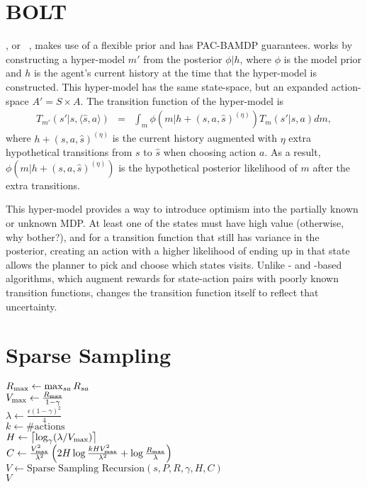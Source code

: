 \section{BOLT}

, or ~\cite{araya2012near}, makes use of a flexible prior and has PAC-BAMDP guarantees.  works by constructing a hyper-model $m'$ from the posterior $\phi|h$, where $\phi$ is the model prior and $h$ is the agent's current history at the time that the hyper-model is constructed. This hyper-model has the same state-space, but an expanded action-space $A' = S \times A$. The transition function of the hyper-model is
\begin{eqnarray}
T_{m'}(s'|s, \langle \hat s, a \rangle) &=& \int_m \phi(m|h+(s,a,\hat s)^{(\eta)})T_m(s'|s,a) d m,
\end{eqnarray}
where $h+(s,a,\hat s)^{(\eta)}$ is the current history augmented with $\eta$ extra hypothetical transitions from $s$ to $\hat s$ when choosing action $a$. As a result, $\phi(m|h+(s,a,\hat s)^{(\eta)})$ is the hypothetical posterior likelihood of $m$ after the extra transitions.

This hyper-model provides a way to introduce optimism into the partially known or unknown MDP. At least one of the states must have high value (otherwise, why bother?), and for a transition function that still has variance in the posterior, creating an action with a higher likelihood of ending up in that state allows the planner to pick and choose which states visits. Unlike - and -based algorithms, which augment rewards for state-action pairs with poorly known transition functions,  changes the transition function itself to reflect that uncertainty.



\section{Sparse Sampling}

\label{sec:rel:ss}

\begin{algorithm}[tb]
	\caption{$\mbox{Sparse~Sampling}(s, P, R, \gamma, \epsilon, \delta)$}
	\label{alg:ss}
	$R_{\rm max} \leftarrow \max_{sa}R_{sa}$\\
	$V_{\rm max} \leftarrow \frac{R_{\rm max}}{1-\gamma}$\\
	$\lambda \leftarrow \frac{\epsilon(1-\gamma)^2} 4$\\
	$k \leftarrow \#\mbox{actions}$\\
	$H \leftarrow \left\lceil\log_\gamma(\lambda/V_{\rm max})\right\rceil$\\
	$C \leftarrow \frac {V_{\rm max}^2}{\lambda^2}\left(2H\log\frac{kHV_{\rm max}^2}{\lambda^2}+\log\frac{R_{\rm max}}{\lambda}\right)$\\
	$V \leftarrow \mbox{Sparse~Sampling~Recursion}(s, P, R, \gamma, H, C)$\\
	\Return $V$
\end{algorithm}

